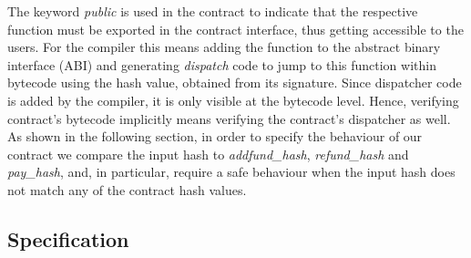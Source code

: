 \documentclass[sigplan,10pt]{acmart}\settopmatter{printfolios=true,printccs=false,printacmref=false}
\begin{document}
%
The keyword \textit{public} is used in the contract to indicate that
the respective function must be exported in the contract interface,
thus getting accessible to the users.
For the compiler this means adding the function to the abstract binary
interface (ABI) and generating \emph{dispatch} code to jump to this function within bytecode using
the hash value, obtained from its signature.
Since dispatcher code is added by the compiler, it is only visible at
the bytecode level. Hence, verifying contract's bytecode implicitly means
verifying the contract's dispatcher as well. 
As shown in the following section, in order to specify the behaviour of our
contract we compare the input hash to \textit{addfund\_hash}, \textit{refund\_hash} and \textit{pay\_hash},
and, in particular, require a safe behaviour when the input hash does not
match any of the contract hash values.   
%  
%
%
%
\subsection{Specification}
\label{sec:spec}
\end{document}
